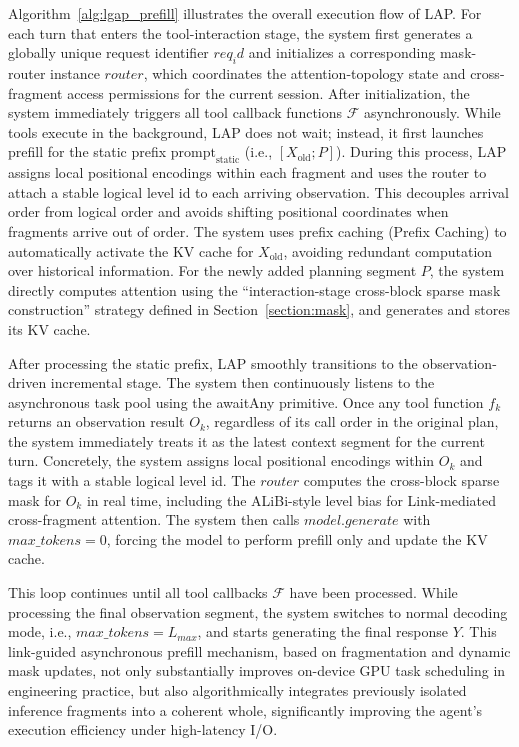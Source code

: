 Algorithm~\ref{alg:lgap_prefill} illustrates the overall execution flow of LAP. For each turn that enters the tool-interaction stage,
the system first generates a globally unique request identifier $req_id$ and initializes a corresponding mask-router instance $router$, which coordinates the attention-topology state and cross-fragment access permissions for the current session.
After initialization, the system immediately triggers all tool callback functions $\mathcal{F}$ asynchronously.
While tools execute in the background, LAP does not wait; instead, it first launches prefill for the static prefix $\text{prompt}_{\text{static}}$ (i.e., $[X_{\text{old}}; P]$).
During this process, LAP assigns local positional encodings within each fragment and uses the router to attach a stable logical level id to each arriving observation.
This decouples arrival order from logical order and avoids shifting positional coordinates when fragments arrive out of order.
The system uses prefix caching (Prefix Caching) to automatically activate the KV cache for $X_{\text{old}}$, avoiding redundant computation over historical information.
For the newly added planning segment $P$, the system directly computes attention using the ``interaction-stage cross-block sparse mask construction'' strategy defined in Section~\ref{section:mask}, and generates and stores its KV cache.

After processing the static prefix, LAP smoothly transitions to the observation-driven incremental stage. The system then continuously listens to the asynchronous task pool using the awaitAny primitive.
Once any tool function $f_k$ returns an observation result $O_k$, regardless of its call order in the original plan, the system immediately treats it as the latest context segment for the current turn.
Concretely, the system assigns local positional encodings within $O_k$ and tags it with a stable logical level id.
The $router$ computes the cross-block sparse mask for $O_k$ in real time, including the ALiBi-style level bias for Link-mediated cross-fragment attention.
The system then calls $model.generate$ with $max\_tokens=0$, forcing the model to perform prefill only and update the KV cache.

This loop continues until all tool callbacks $\mathcal{F}$ have been processed.
While processing the final observation segment, the system switches to normal decoding mode, i.e., $max\_tokens=L_{max}$, and starts generating the final response $Y$.
This link-guided asynchronous prefill mechanism, based on fragmentation and dynamic mask updates, not only substantially improves on-device GPU task scheduling in engineering practice,
but also algorithmically integrates previously isolated inference fragments into a coherent whole, significantly improving the agent's execution efficiency under high-latency I/O.
